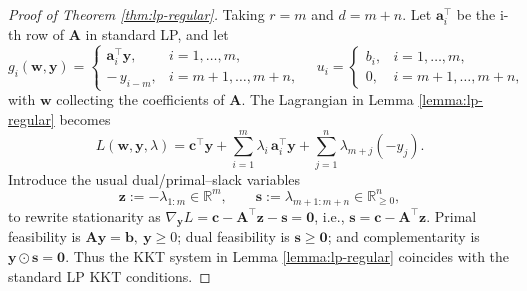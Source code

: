 \documentclass{amsart} %
\def\vzero{{\bm{0}}}
\def\va{{\bm{a}}}
\def\vb{{\bm{b}}}
\def\vc{{\bm{c}}}
\def\vs{{\bm{s}}}
\def\vw{{\bm{w}}}
\def\vy{{\bm{y}}}
\def\vz{{\bm{z}}}
\def\mA{{\bm{A}}}
\def\sR{{\mathbb{R}}}
\theoremstyle{definition}
\theoremstyle{remark}
\begin{document}
\begin{proof}[Proof of Theorem \ref{thm:lp-regular}]
Taking $r=m$ and $d=m+n$. Let $\va^\top_i$ be the i-th row of $\mA$ in standard LP, and let
\[
g_i(\vw,\vy)=
\begin{cases}
\va_i^\top \vy,& i=1,\dots,m,\\[2pt]
-\,y_{i-m},& i=m+1,\dots,m+n,
\end{cases}
\quad
u_i=
\begin{cases}
b_i,& i=1,\dots,m,\\[2pt]
0,& i=m+1,\dots,m+n,
\end{cases}
\]
with \(\vw\) collecting the coefficients of \(\mA\).
The Lagrangian in Lemma \ref{lemma:lp-regular} becomes
\[
L(\vw,\vy,\lambda)=\vc^\top \vy+\sum_{i=1}^m \lambda_i\,\va_i^\top \vy+\sum_{j=1}^n \lambda_{m+j}(-y_j).
\]
Introduce the usual dual/primal–slack variables
\[
\vz:=-\lambda_{1:m}\in\sR^m,\qquad \vs:=\lambda_{m+1:m+n}\in\sR^n_{\ge 0},
\]
to rewrite stationarity as \(\nabla_{\vy} L=\vc-\mA^\top \vz-\vs=\vzero\), i.e., \(\vs=\vc-\mA^\top \vz\).
Primal feasibility is \(\mA\vy=\vb,\ \vy\ge 0\); dual feasibility is \(\vs\ge \vzero\); and complementarity is \(\vy\odot \vs=\vzero\).
Thus the KKT system in Lemma \ref{lemma:lp-regular} coincides with the standard LP KKT conditions.


\end{proof}
\end{document}
